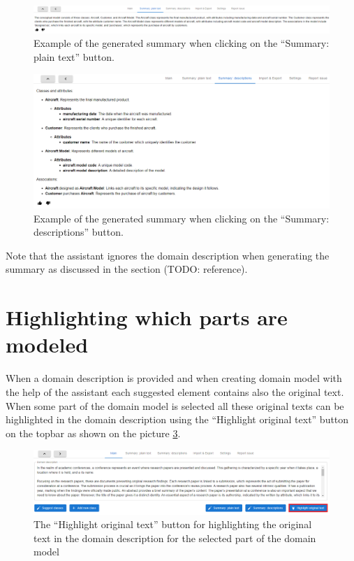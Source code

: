 \begin{figure}[!h]
    \includegraphics[scale=0.295]{../docs/images/frontend/summary-plain-text.png}
    \caption{\centering Example of the generated summary when clicking on the ``Summary: plain text'' button.}
    \label{fig:summary_plain_text}
\end{figure}

\begin{figure}[!h]
    \includegraphics[scale=0.41]{../docs/images/frontend/summary-descriptions.png}
    \caption{\centering Example of the generated summary when clicking on the ``Summary: descriptions'' button.}
    \label{fig:summary_description}
\end{figure}

Note that the assistant ignores the domain description when generating the summary as discussed in the section (TODO: reference).


\section{Highlighting which parts are modeled}

When a domain description is provided and when creating domain model with the help of the assistant each suggested element contains also the original text. When some part of the domain model is selected all these original texts can be highlighted in the domain description using the ``Highlight original text'' button on the topbar as shown on the picture \ref{fig:highlight_original_text_button}.

\begin{figure}[!h]
    \includegraphics[scale=0.36]{../docs/images/frontend/highlight-original-text-button.png}
    \caption{\centering The ``Highlight original text'' button for highlighting the original text in the domain description for the selected part of the domain model}
    \label{fig:highlight_original_text_button}
\end{figure}

